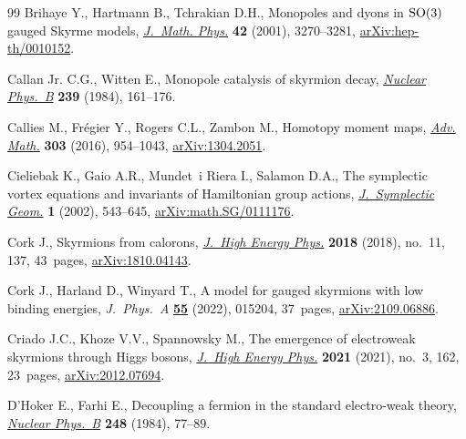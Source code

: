\documentclass[pdftex]{sigma}
\newcommand{\1}{{\mathbb{1}}}
\numberwithin{equation}{section}
\begin{document}
\begin{thebibliography}{99}
Brihaye Y., Hartmann B., Tchrakian D.H., Monopoles and dyons in {${\rm SO}(3)$}
 gauged {S}kyrme models, \href{https://doi.org/10.1063/1.1380253}{\textit{J.~Math. Phys.}} \textbf{42} (2001),
 3270--3281, \href{https://arxiv.org/abs/hep-th/0010152}{arXiv:hep-th/0010152}.

Callan Jr. C.G., Witten E., Monopole catalysis of skyrmion decay,
 \href{https://doi.org/10.1016/0550-3213(84)90088-9}{\textit{Nuclear Phys.~B}} \textbf{239} (1984), 161--176.

Callies M., Fr\'egier Y., Rogers C.L., Zambon M., Homotopy moment maps,
 \href{https://doi.org/10.1016/j.aim.2016.08.012}{\textit{Adv. Math.}} \textbf{303} (2016), 954--1043, \href{https://arxiv.org/abs/1304.2051}{arXiv:1304.2051}.

Cieliebak K., Gaio A.R., Mundet~i Riera I., Salamon D.A., The symplectic vortex
 equations and invariants of {H}amiltonian group actions,
 \href{https://doi.org/10.4310/JSG.2001.v1.n3.a3}{\textit{J.~Symplectic Geom.}} \textbf{1} (2002), 543--645,
 \href{https://arxiv.org/abs/math.SG/0111176}{arXiv:math.SG/0111176}.

Cork J., Skyrmions from calorons, \href{https://doi.org/10.1007/jhep11(2018)137}{\textit{J.~High Energy Phys.}} \textbf{2018}
 (2018), no.~11, 137, 43~pages, \href{https://arxiv.org/abs/1810.04143}{arXiv:1810.04143}.

Cork J., Harland D., Winyard T., A model for gauged skyrmions with low binding
 energies, \textit{J.~Phys.~A} \href{https://doi.org/10.1088/1751-8121/ac3c81}{\textbf{55}} (2022), 015204, 37~pages,
 \href{https://arxiv.org/abs/2109.06886}{arXiv:2109.06886}.

Criado J.C., Khoze V.V., Spannowsky M., The emergence of electroweak skyrmions
 through {H}iggs bosons, \href{https://doi.org/10.1007/jhep03(2021)162}{\textit{J.~High Energy Phys.}} \textbf{2021} (2021),
 no.~3, 162, 23~pages, \href{https://arxiv.org/abs/2012.07694}{arXiv:2012.07694}.

D'Hoker E., Farhi E., Decoupling a fermion in the standard electro-weak theory,
 \href{https://doi.org/10.1016/0550-3213(84)90587-X}{\textit{Nuclear Phys.~B}} \textbf{248} (1984), 77--89.


\end{thebibliography}
\end{document}
